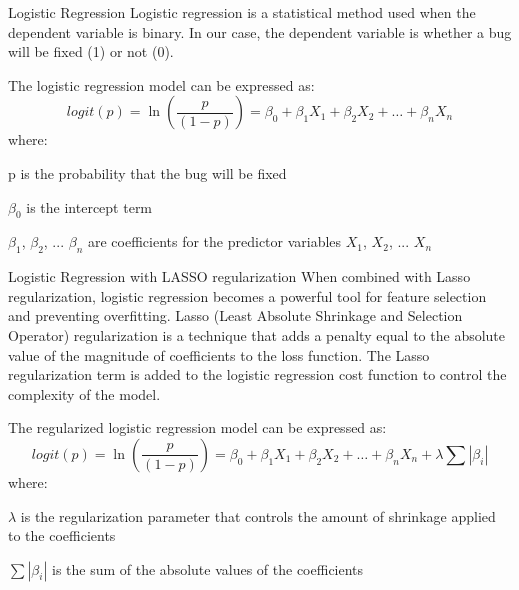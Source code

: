 \documentclass[10pt]{beamer}
\begin{document}
\begin{frame}[t]{Logistic Regression} \justifying \vspace{10pt}
	Logistic regression is a statistical method used when the dependent variable is binary. In our case, the dependent variable is whether a bug will be fixed (1) or not (0).
	
	The logistic regression model can be expressed as:
	\[ logit\left( p\right)=\ln \left( \dfrac{p}{\left( 1-p\right) }\right) =\beta_{0}+\beta _{1}X_{1}+\beta _{2}X_{2}+\ldots +\beta_{n}X_{n} \]
	where:
	\begin{description}[font=$\bullet$~\normalfont\scshape\color{red!50!black}]
	\item p is the probability that the bug will be fixed
	\item $\beta_{0}$ is the intercept term
	\item $\beta_{1}$, $\beta_{2}$, ... $\beta_{n}$ are coefficients for the predictor variables $X_{1}$, $X_{2}$, ... $X_{n}$
	\end{description}
\end{frame}


\begin{frame}[t]{Logistic Regression with LASSO regularization} \justifying \vspace{8pt}
	When combined with Lasso regularization, logistic regression becomes a powerful tool for feature selection and preventing overfitting. Lasso (Least Absolute Shrinkage and Selection Operator) regularization is a technique that adds a penalty equal to the absolute value of the magnitude of coefficients to the loss function. The Lasso regularization term is added to the logistic regression cost function to control the complexity of the model. 
	
	The regularized logistic regression model can be expressed as:
	\[ logit\left( p\right)=\ln \left( \dfrac{p}{\left( 1-p\right) }\right) =\beta_{0}+\beta _{1}X_{1}+\beta _{2}X_{2}+\ldots +\beta_{n}X_{n} +\lambda \sum \left| \beta _{i}\right|\]
	where:
	\begin{description}[font=$\bullet$~\normalfont\scshape\color{red!50!black}]
		\item $\lambda$ is the regularization parameter that controls the amount of shrinkage applied to the coefficients
		\item $\sum \left| \beta _{i}\right|$ is the sum of the absolute values of the coefficients
	\end{description}
\end{frame}
\end{document}
